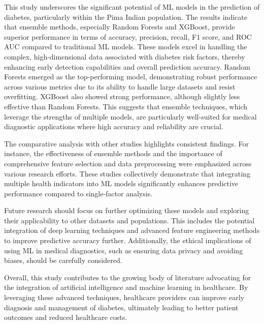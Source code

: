 

This study underscores the significant potential of ML models in the prediction of diabetes, particularly within the Pima Indian population. The results indicate that ensemble methods, especially Random Forests and XGBoost, provide superior performance in terms of accuracy, precision, recall, F1 score, and ROC AUC compared to traditional ML models. These models excel in handling the complex, high-dimensional data associated with diabetes risk factors, thereby enhancing early detection capabilities and overall prediction accuracy.
Random Forests emerged as the top-performing model, demonstrating robust performance across various metrics due to its ability to handle large datasets and resist overfitting. XGBoost also showed strong performance, although slightly less effective than Random Forests. This suggests that ensemble techniques, which leverage the strengths of multiple models, are particularly well-suited for medical diagnostic applications where high accuracy and reliability are crucial.

The comparative analysis with other studies highlights consistent findings. For instance, the effectiveness of ensemble methods and the importance of comprehensive feature selection and data preprocessing were emphasized across various research efforts. These studies collectively demonstrate that integrating multiple health indicators into ML models significantly enhances predictive performance compared to single-factor analysis.

Future research should focus on further optimizing these models and exploring their applicability to other datasets and populations. This includes the potential integration of deep learning techniques and advanced feature engineering methods to improve predictive accuracy further. Additionally, the ethical implications of using ML in medical diagnostics, such as ensuring data privacy and avoiding biases, should be carefully considered.

Overall, this study contributes to the growing body of literature advocating for the integration of artificial intelligence and machine learning in healthcare. By leveraging these advanced techniques, healthcare providers can improve early diagnosis and management of diabetes, ultimately leading to better patient outcomes and reduced healthcare costs.

